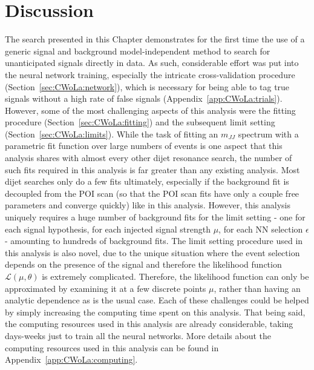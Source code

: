 \section{Discussion}
\label{sec:CWoLa:discussion}
The search presented in this Chapter demonstrates for the first time the use of a generic signal and background model-independent method to search for unanticipated signals directly in data.
As such, considerable effort was put into the neural network training, especially the intricate cross-validation procedure (Section~\ref{sec:CWoLa:network}), which is necessary for being able to tag true signals without a high rate of false signals (Appendix~\ref{app:CWoLa:trials}).
However, some of the most challenging aspects of this analysis were the fitting procedure (Section~\ref{sec:CWoLa:fitting}) and the subsequent limit setting (Section~\ref{sec:CWoLa:limits}).
While the task of fitting an $m_{JJ}$ spectrum with a parametric fit function over large numbers of events is one aspect that this analysis shares with almost every other dijet resonance search, the number of such fits required in this analysis is far greater than any existing analysis.
Most dijet searches only do a few fits ultimately, especially if the background fit is decoupled from the POI scan (so that the POI scan fits have only a couple free parameters and converge quickly) like in this analysis.
However, this analysis uniquely requires a huge number of background fits for the limit setting - one for each signal hypothesis, for each injected signal strength $\mu$, for each NN selection $\epsilon$ - amounting to hundreds of background fits.
The limit setting procedure used in this analysis is also novel, due to the unique situation where the event selection depends on the presence of the signal and therefore the likelihood function $\mathcal{L}(\mu,\theta)$ is extremely complicated.
Therefore, the likelihood function can only be approximated by examining it at a few discrete points $\mu$, rather than having an analytic dependence as is the usual case.
Each of these challenges could be helped by simply increasing the computing time spent on this analysis.
That being said, the computing resources used in this analysis are already considerable, taking days-weeks just to train all the neural networks.
More details about the computing resources used in this analysis can be found in Appendix~\ref{app:CWoLa:computing}.


